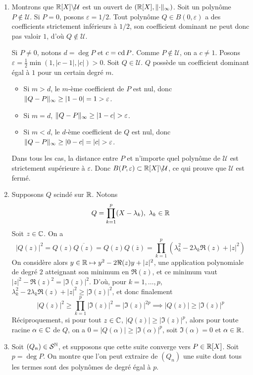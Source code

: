 \begin{solution}
    \begin{enumerate}
        \item Montrons que $\operatorname{\mathbb R}[X]\backslash\mathcal U$ est un ouvert de $(\operatorname{\mathbb R}[X],\lVert\cdot\rVert_\infty)$.
        Soit un polynôme $P \notin \mathcal U$. 
        Si $P = 0$, posons $\varepsilon = 1/2$. Tout polynôme $Q \in B(0, \varepsilon)$ a des coefficients strictement inférieurs à $1/2$, son coefficient dominant ne peut donc pas valoir $1$, d'où $Q \notin \mathcal U$.
        
        Si $P \neq 0$, notons $d = \deg P$ et $c = \operatorname{cd} P$. Comme $P \notin \mathcal U$, on a $c \neq 1$.
        Posons $\varepsilon = \frac{1}{2}\min(1, |c - 1|, |c|) > 0$.
        Soit $Q \in \mathcal U$. $Q$ possède un coefficient dominant égal à $1$ pour un certain degré $m$.
        \begin{itemize}
            \item Si $m > d$, le $m$-ème coefficient de $P$ est nul, donc $\lVert Q-P\rVert_\infty \geq |1 - 0| = 1 > \varepsilon$.
            \item Si $m = d$, $\lVert Q-P\rVert_\infty \geq |1 - c| > \varepsilon$.
            \item Si $m < d$, le $d$-ème coefficient de $Q$ est nul, donc $\lVert Q-P\rVert_\infty \geq |0 - c| = |c| > \varepsilon$.
        \end{itemize}
        Dans tous les cas, la distance entre $P$ et n'importe quel polynôme de $\mathcal U$ est strictement supérieure à $\varepsilon$. Donc $B(P,\varepsilon) \subset \operatorname{\mathbb R}[X]\backslash\mathcal U$, ce qui prouve que $\mathcal U$ est fermé.
        \item Supposons $Q$ scindé sur $\operatorname{\mathbb R}$.
        Notons
        \[
            Q=\prod_{k=1}^p(X-\lambda_k),\ \lambda_k\in\R  
        \]
        Soit $z\in\operatorname{\mathbb C}$. On a
        \[
            |Q(z)|^2=Q(z)\overline{Q(z)}=Q(z)Q(\overline z)=\prod_{k=1}^p(\lambda_k^2-2\lambda_k\Re(z)+|z|^2)
        \]
        On considère alors $y\in\operatorname{\mathbb R}\mapsto y^2-2\Re(z)y+|z|^2$, une application polynomiale de degré $2$ atteignant son minimum en $\Re(z)$, et ce minimum vaut $|z|^2 - \Re(z)^2 = |\Im(z)|^2$.
        D'où, pour $k=1,\dots,p$, $\lambda_k^2-2\lambda_k\Re(z)+|z|^2\geq |\Im(z)|^2$, et donc finalement 
        \[
            |Q(z)|^2\geq\prod_{k=1}^p|\Im(z)|^2=|\Im(z)|^{2p} \implies |Q(z)|\geq|\Im(z)|^p
        \]
        Réciproquement, si pour tout $z\in \operatorname{\mathbb C}$, $|Q(z)|\geq|\Im(z)|^p$, alors pour toute racine $\alpha\in\operatorname{\mathbb C}$ de $Q$, on a $0=|Q(\alpha)|\geq|\Im(\alpha)|^p$, soit $\Im(\alpha)=0$ et $\alpha\in\operatorname{\mathbb R}$.
        \item Soit $(Q_n)\in\mathcal S^{\operatorname{\mathbb N}}$, et supposons que cette suite converge vers $P\in\operatorname{\mathbb R}[X]$.
        Soit $p=\deg P$. On montre que l'on peut extraire de $(Q_n)$ une suite dont tous les termes sont des polynômes de degré égal à $p$.
        

\end{enumerate}
\end{solution}
